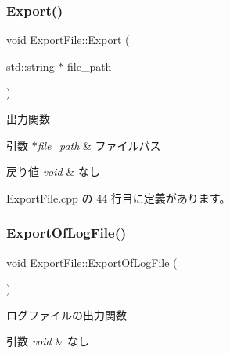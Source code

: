 \mbox{\label{class_export_file_aadb97e06e12bbe978e5527b4b540ece8}} 
\subsubsection{\texorpdfstring{Export()}{Export()}}
{\footnotesize\ttfamily void Export\+File\+::\+Export (\begin{DoxyParamCaption}\item[{std\+::string $\ast$}]{file\+\_\+path }\end{DoxyParamCaption})}



出力関数 


\begin{DoxyParams}{引数}
{\em $\ast$file\+\_\+path} & ファイルパス \\
\hline
\end{DoxyParams}

\begin{DoxyRetVals}{戻り値}
{\em void} & なし \\
\hline
\end{DoxyRetVals}


 Export\+File.\+cpp の 44 行目に定義があります。

\mbox{\label{class_export_file_ab8a6f3c0bf115e400beb188bc95b3d5c}} 
\subsubsection{\texorpdfstring{Export\+Of\+Log\+File()}{ExportOfLogFile()}}
{\footnotesize\ttfamily void Export\+File\+::\+Export\+Of\+Log\+File (\begin{DoxyParamCaption}{ }\end{DoxyParamCaption})\hspace{0.3cm}{\ttfamily [private]}}



ログファイルの出力関数 


\begin{DoxyParams}{引数}
{\em void} & なし \\
\hline
\end{DoxyParams}


